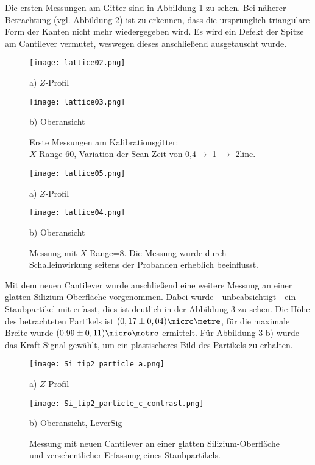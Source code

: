 Die ersten Messungen am Gitter sind in Abbildung \ref{fig:Lattice1} zu sehen. Bei näherer Betrachtung (vgl. Abbildung \ref{fig:Lattice2}) ist zu erkennen, dass die ursprünglich triangulare Form der Kanten nicht mehr wiedergegeben wird. Es wird ein Defekt der Spitze am Cantilever vermutet, weswegen dieses anschließend ausgetauscht wurde.
\begin{figure}[H]
	\centering
\begin{minipage}{0.45\textwidth}
\centering
		\texttt{[image: lattice02.png]}
		\caption*{a) $Z$-Profil}
	\end{minipage}
	\hfill
\begin{minipage}{0.45\textwidth}
\centering
		\texttt{[image: lattice03.png]}
		\caption*{b) Oberansicht}
	\end{minipage}
	\caption[Erste Messungen am Kalibrationsgitter]{Erste Messungen am Kalibrationsgitter:\\ $X$-Range 60\micro\metre,  Variation der Scan-Zeit von 0,4$\rightarrow$ 1 $\rightarrow$ 2\second\per line.}
	\label{fig:Lattice1}
\end{figure}

\begin{figure}[H]
\centering
\begin{minipage}{0.45\textwidth}
\centering
		\texttt{[image: lattice05.png]}
		\caption*{a) $Z$-Profil}
	\end{minipage}
	\hfill
\begin{minipage}{0.45\textwidth}
\centering
		\texttt{[image: lattice04.png]}
		\caption*{b) Oberansicht}
	\end{minipage}
	\caption[Messung mit $X$-Range=8\micro\metre]{Messung mit $X$-Range=8\micro\metre. Die Messung wurde durch Schalleinwirkung seitens der Probanden erheblich beeinflusst.}
	\label{fig:Lattice2}
\end{figure}

Mit dem neuen Cantilever wurde anschließend eine weitere Messung an einer glatten Silizium-Oberfläche vorgenommen. Dabei wurde - unbeabsichtigt - ein Staubpartikel mit erfasst, dies ist deutlich in der Abbildung \ref{fig:Si_particle} zu sehen. Die Höhe des betrachteten Partikels ist $(0,17 \pm 0,04)\micro\metre$, für die maximale Breite wurde $(0.99 \pm 0,11)\micro\metre$ ermittelt. Für Abbildung \ref{fig:Si_particle} b) wurde das Kraft-Signal gewählt, um ein plastischeres Bild des Partikels zu erhalten.
\begin{figure}[H]
\centering
	\begin{minipage}{0.45\textwidth}
	\centering
		\texttt{[image: Si\_tip2\_particle\_a.png]}
		\caption*{a) $Z$-Profil}
	\end{minipage}
	\hfill
	\begin{minipage}{0.45\textwidth}
	\centering
		\texttt{[image: Si\_tip2\_particle\_c\_contrast.png]}
	\caption*{b) Oberansicht, LeverSig}
	\end{minipage}
	\caption[Messung mit Staubpartikel]{Messung mit neuen Cantilever an einer glatten Silizium-Oberfläche und versehentlicher Erfassung eines Staubpartikels.}
	\label{fig:Si_particle}
	\vspace{-1em}
\end{figure}

